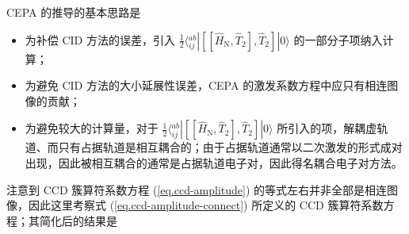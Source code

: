 CEPA 的推导的基本思路是
\begin{itemize}[nosep]
  \item 为补偿 CID 方法的误差，引入 $\frac{1}{2} \langle {}_{ij}^{ab} | [[\hat H_\mathrm{N}, \hat T_2], \hat T_2] | 0 \rangle$ 的一部分子项纳入计算；
  \item 为避免 CID 方法的大小延展性误差，CEPA 的激发系数方程中应只有相连图像的贡献\cite{Brueckner-Brueckner.PR.1955, Goldstone-Goldstone.PRSLA.1957}；
  \item 为避免较大的计算量，对于 $\frac{1}{2} \langle {}_{ij}^{ab} | [[\hat H_\mathrm{N}, \hat T_2], \hat T_2] | 0 \rangle$ 所引入的项，解耦虚轨道、而只有占据轨道是相互耦合的；由于占据轨道通常以二次激发的形式成对出现，因此被相互耦合的通常是占据轨道电子对，因此得名耦合电子对方法。
\end{itemize}

注意到 CCD 簇算符系数方程 (\ref{eq.ccd-amplitude}) 的等式左右并非全部是相连图像，因此这里考察式 (\ref{eq.ccd-amplitude-connect}) 所定义的 CCD 簇算符系数方程；其简化后的结果是












